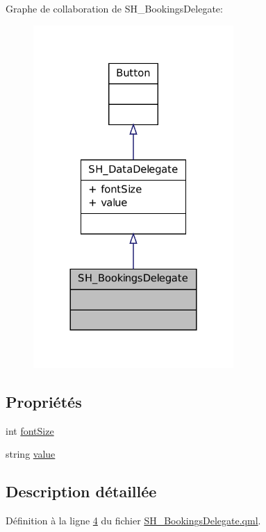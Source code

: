 Graphe de collaboration de S\-H\-\_\-\-Bookings\-Delegate\-:
\nopagebreak
\begin{figure}[H]
\begin{center}
\leavevmode
\includegraphics[width=216pt]{classSH__BookingsDelegate__coll__graph}
\end{center}
\end{figure}
\subsection*{Propriétés}
\begin{DoxyCompactItemize}
\item 
int \hyperlink{classSH__DataDelegate_afbb41ad9b513c7f27e7b5ad90d82e95b}{font\-Size}
\item 
string \hyperlink{classSH__DataDelegate_acb9da3c73493c88865e08d9575f26482}{value}
\end{DoxyCompactItemize}


\subsection{Description détaillée}


Définition à la ligne \hyperlink{SH__BookingsDelegate_8qml_source_l00004}{4} du fichier \hyperlink{SH__BookingsDelegate_8qml_source}{S\-H\-\_\-\-Bookings\-Delegate.\-qml}.



